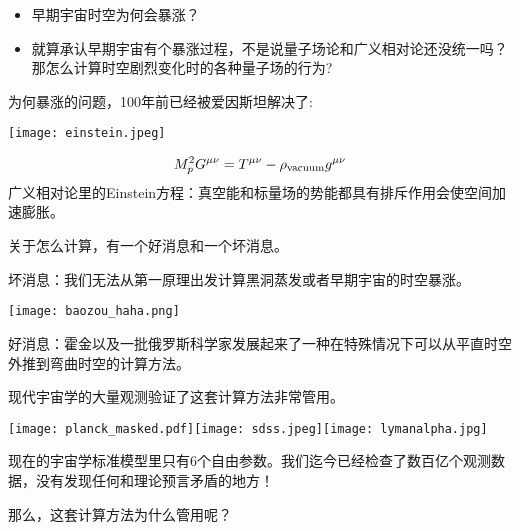 \documentclass[CJK]{beamer}
\begin{document}
\begin{frame}
\bch
\begin{itemize}
\item{早期宇宙时空{\blue \large 为何会暴涨}？}
\item{就算承认早期宇宙有个暴涨过程，不是说量子场论和广义相对论还没统一吗？那{\blue \large 怎么计算}时空剧烈变化时的各种量子场的行为?}
\end{itemize}
\ech
\end{frame}

\begin{frame}
\bch
{\blue 为何暴涨}的问题，100年前已经被{\blue 爱因斯坦解决了}:

\begin{minipage}{0.45\textwidth}
\texttt{[image: einstein.jpeg]}
\end{minipage}
\begin{minipage}{0.45\textwidth}
$$ M_p^2 G^{\mu\nu} =  T^{\mu\nu} - \rho_{\rm vacuum} g^{\mu\nu} $$
广义相对论里的Einstein方程：真空能和标量场的势能都具有排斥作用会使空间加速膨胀。

\end{minipage}
\ech
\end{frame}

\begin{frame}
\bch
关于{\blue 怎么计算}，有一个好消息和一个坏消息。
\ech
\end{frame}

\begin{frame}
\bch
\begin{minipage}{0.6\textwidth}
坏消息：我们无法从第一原理出发计算黑洞蒸发或者早期宇宙的时空暴涨。
\end{minipage}
\begin{minipage}{0.3\textwidth}
\texttt{[image: baozou\_haha.png]}
\end{minipage}

\skipline
\skipline

好消息：霍金以及一批俄罗斯科学家发展起来了一种在特殊情况下可以从平直时空外推到弯曲时空的计算方法。
\ech
\end{frame}


\begin{frame}
\bch
现代宇宙学的大量观测验证了这套计算方法非常管用。

\texttt{[image: planck\_masked.pdf]}\texttt{[image: sdss.jpeg]}\texttt{[image: lymanalpha.jpg]}

现在的宇宙学标准模型里只有6个自由参数。我们迄今已经检查了数百亿个观测数据，没有发现任何和理论预言矛盾的地方！

\skipline
\skipline
那么，这套计算方法为什么管用呢？
\ech
\end{frame}
\end{document}

